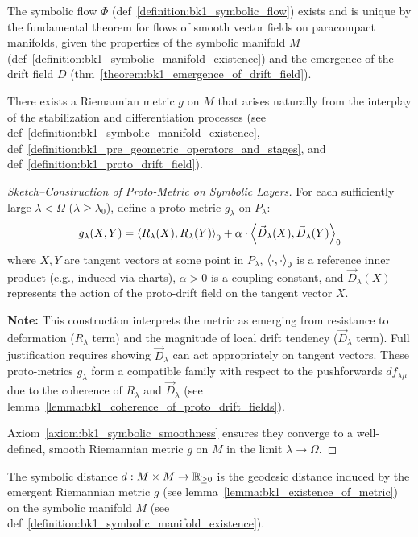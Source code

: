 \begin{lemma}
\label{lemma:bk1_existence_and_uniqueness_of_flow}
The symbolic flow $\Phi$ (def~\ref{definition:bk1_symbolic_flow}) exists and is unique by the fundamental theorem for flows of smooth vector fields on paracompact manifolds, given the properties of the symbolic manifold $M$ (def~\ref{definition:bk1_symbolic_manifold_existence}) and the emergence of the drift field $D$ (thm~\ref{theorem:bk1_emergence_of_drift_field}).
\end{lemma}
\begin{lemma}
\label{lemma:bk1_existence_of_metric}
There exists a Riemannian metric $g$ on $M$ that arises naturally from the interplay of the stabilization and differentiation processes (see def~\ref{definition:bk1_symbolic_manifold_existence}, def~\ref{definition:bk1_pre_geometric_operators_and_stages}, and def~\ref{definition:bk1_proto_drift_field}).
\begin{proof}[Sketch–Construction of Proto-Metric on Symbolic Layers]
\label{proof:bk1_sketch_construction_proto_metric}
For each sufficiently large $\lambda < \Omega$ ($\lambda \ge \lambda_0$), define a proto-metric $g_\lambda$ on $P_\lambda$:
\[
g_\lambda(X, Y) = \left\langle R_\lambda(X), R_\lambda(Y) \right\rangle_0 + \alpha \cdot \left\langle \vec{D}_\lambda(X), \vec{D}_\lambda(Y) \right\rangle_0
\]
where $X, Y$ are tangent vectors at some point in $P_\lambda$, $\left\langle \cdot, \cdot \right\rangle_0$ is a reference inner product (e.g., induced via charts), $\alpha > 0$ is a coupling constant, and $\vec{D}_\lambda(X)$ represents the action of the proto-drift field on the tangent vector $X$.

\smallskip
\noindent
\textbf{Note:} This construction interprets the metric as emerging from resistance to deformation ($R_\lambda$ term) and the magnitude of local drift tendency ($\vec{D}_\lambda$ term). Full justification requires showing $\vec{D}_\lambda$ can act appropriately on tangent vectors. These proto-metrics $g_\lambda$ form a compatible family with respect to the pushforwards $df_{\lambda\mu}$ due to the coherence of $R_\lambda$ and $\vec{D}_\lambda$ (see lemma~\ref{lemma:bk1_coherence_of_proto_drift_fields}). 

Axiom~\ref{axiom:bk1_symbolic_smoothness} ensures they converge to a well-defined, smooth Riemannian metric $g$ on $M$ in the limit $\lambda \to \Omega$.
\end{proof}
\end{lemma}
\begin{definition}
\label{definition:bk1_symbolic_distance}
The symbolic distance $d: M \times M \to \mathbb{R}_{\geq 0}$ is the geodesic distance induced by the emergent Riemannian metric $g$ (see lemma~\ref{lemma:bk1_existence_of_metric}) on the symbolic manifold $M$ (see def~\ref{definition:bk1_symbolic_manifold_existence}).
\end{definition}

